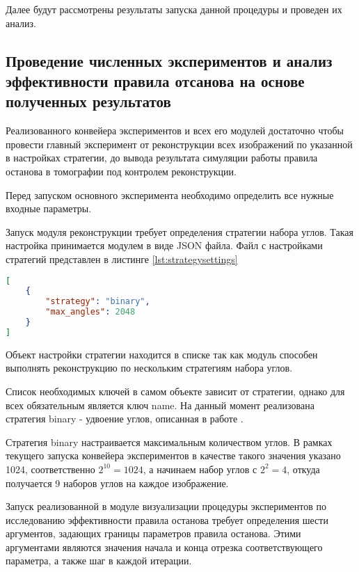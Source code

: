 Далее будут рассмотрены результаты запуска данной процедуры и проведен их анализ.

\subsection{Проведение численных экспериментов и анализ эффективности правила отсанова на основе полученных результатов}

Реализованного конвейера экспериментов и всех его модулей достаточно чтобы провести главный эксперимент от реконструкции всех изображений по указанной в настройках стратегии, до вывода результата симуляции работы правила останова в томографии под контролем реконструкции.

Перед запуском основного эксперимента необходимо определить все нужные входные параметры.

Запуск модуля реконструкции требует определения стратегии набора углов. Такая настройка принимается модулем в виде JSON файла. Файл с настройками стратегий представлен в листинге \ref*{lst:strategysettings}

\begin{lstlisting}[language=json, caption={Файл конфигурации стратегий набора углов для конвейера экспериментов}, label={lst:strategysettings}]
[
    {
        "strategy": "binary",
        "max_angles": 2048
    }
]
\end{lstlisting}

Объект настройки стратегии находится в списке так как модуль способен выполнять реконструкцию по нескольким стратегиям набора углов.

Список необходимых ключей в самом объекте зависит от стратегии, однако для всех обязательным является ключ name. На данный момент реализована стратегия binary - удвоение углов, описанная в работе \cite{gilmanov2024applicability}.

Стратегия binary настраивается максимальным количеством углов. В рамках текущего запуска конвейера экспериментов в качестве такого значения указано 1024, соответственно \(2^{10} = 1024\), а начинаем набор углов с \(2^2 = 4\), откуда получается 9 наборов углов на каждое изображение.

Запуск реализованной в модуле визуализации процедуры экспериментов по исследованию эффективности правила останова требует определения шести аргументов, задающих границы параметров правила останова. Этими аргументами являются значения начала и конца отрезка соответствующего параметра, а также шаг в каждой итерации.

